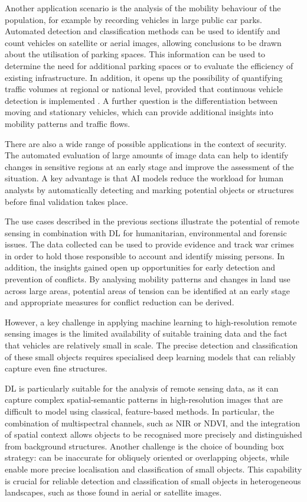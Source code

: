 Another application scenario is the analysis of the mobility behaviour of the population, for example by recording vehicles in large public car parks. Automated detection and classification methods can be used to identify and count vehicles on satellite or aerial images, allowing conclusions to be drawn about the utilisation of parking spaces. This information can be used to determine the need for additional parking spaces or to evaluate the efficiency of existing infrastructure. In addition, it opens up the possibility of quantifying traffic volumes at regional or national level, provided that continuous vehicle detection is implemented \cite{Eikvil2009}. A further question is the differentiation between moving and stationary vehicles, which can provide additional insights into mobility patterns and traffic flows.

There are also a wide range of possible applications in the context of security. The automated evaluation of large amounts of image data can help to identify changes in sensitive regions at an early stage and improve the assessment of the situation. A key advantage is that AI models reduce the workload for human analysts by automatically detecting and marking potential objects or structures before final validation takes place.

The use cases described in the previous sections illustrate the potential of remote sensing in combination with \acrfull{DL} for humanitarian, environmental and forensic issues. The data collected can be used to provide evidence and track war crimes in order to hold those responsible to account and identify missing persons. In addition, the insights gained open up opportunities for early detection and prevention of conflicts. By analysing mobility patterns and changes in land use across large areas, potential areas of tension can be identified at an early stage and appropriate measures for conflict reduction can be derived.

However, a key challenge in applying machine learning to high-resolution remote sensing images is the limited availability of suitable training data and the fact that vehicles are relatively small in scale. The precise detection and classification of these small objects requires specialised deep learning models that can reliably capture even fine structures.

\Acrlong{DL} is particularly suitable for the analysis of remote sensing data, as it can capture complex spatial-semantic patterns in high-resolution images that are difficult to model using classical, feature-based methods. In particular, the combination of multispectral channels, such as \acrshort{NIR} or \acrshort{NDVI}, and the integration of spatial context allows objects to be recognised more precisely and distinguished from background structures. Another challenge is the choice of bounding box strategy:  can be inaccurate for obliquely oriented or overlapping objects, while  enable more precise localisation and classification of small objects. This capability is crucial for reliable detection and classification of small objects in heterogeneous landscapes, such as those found in aerial or satellite images.

